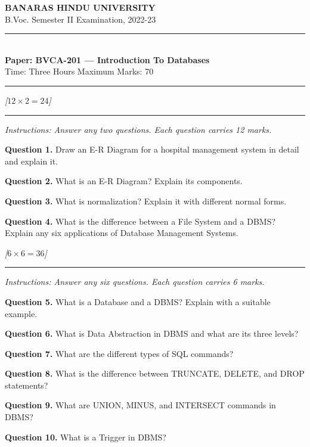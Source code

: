 \documentclass[11pt,a4paper]{article}
\newcommand{\pts}[1]{\hfill\textit{[#1]}}
\begin{document}
\begin{center}
  {\large\bfseries BANARAS HINDU UNIVERSITY}\\[2pt]
  {\normalsize B.Voc. Semester II Examination, 2022-23}\\[6pt]
  \rule{0.8\linewidth}{0.5pt}\\[6pt]
  {\large\bfseries Paper: BVCA-201 --- Introduction To Databases}\\[4pt]
  {\normalsize Time: Three Hours \hfill Maximum Marks: 70}
\end{center}

\rule{\linewidth}{0.4pt}

\smallskip
\bigskip{}\pts{$12 \times 2 = 24$}
\rule{\linewidth}{0.4pt}\smallskip

\noindent\textit{Instructions: Answer any two questions. Each question carries 12 marks.}

\medskip\noindent\textbf{Question 1.} Draw an E-R Diagram for a hospital management system in detail and explain it.

\medskip\noindent\textbf{Question 2.} What is an E-R Diagram? Explain its components.

\medskip\noindent\textbf{Question 3.} What is normalization? Explain it with different normal forms.

\medskip\noindent\textbf{Question 4.} What is the difference between a File System and a DBMS? Explain any six applications of Database Management Systems.

\bigskip{}\pts{$6 \times 6 = 36$}
\rule{\linewidth}{0.4pt}\smallskip

\noindent\textit{Instructions: Answer any six questions. Each question carries 6 marks.}

\medskip\noindent\textbf{Question 5.} What is a Database and a DBMS? Explain with a suitable example.

\medskip\noindent\textbf{Question 6.} What is Data Abstraction in DBMS and what are its three levels?

\medskip\noindent\textbf{Question 7.} What are the different types of SQL commands?

\medskip\noindent\textbf{Question 8.} What is the difference between TRUNCATE, DELETE, and DROP statements?

\medskip\noindent\textbf{Question 9.} What are UNION, MINUS, and INTERSECT commands in DBMS?

\medskip\noindent\textbf{Question 10.} What is a Trigger in DBMS?
\end{document}
